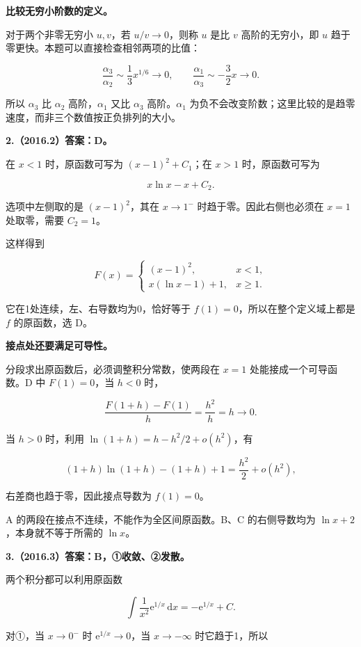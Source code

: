 \documentclass[UTF8,11pt,fontset=windows]{ctexart}
\begin{document}
\textbf{比较无穷小阶数的定义。}

对于两个非零无穷小 $u,v$，若 $u/v\to0$，则称 $u$ 是比 $v$ 高阶的无穷小，即 $u$ 趋于零更快。本题可以直接检查相邻两项的比值：

$$
\frac{\alpha_3}{\alpha_2}\sim\frac13x^{1/6}\longrightarrow0,
\qquad
\frac{\alpha_1}{\alpha_3}\sim-\frac32x\longrightarrow0.
$$

所以 $\alpha_3$ 比 $\alpha_2$ 高阶，$\alpha_1$ 又比 $\alpha_3$ 高阶。$\alpha_1$ 为负不会改变阶数；这里比较的是趋零速度，而非三个数值按正负排列的大小。

\clearpage

\textbf{2.（2016.2）答案：D。}

在 $x<1$ 时，原函数可写为 $(x-1)^2+C_1$；在 $x>1$ 时，原函数可写为

$$
x\ln x-x+C_2.
$$

选项中左侧取的是 $(x-1)^2$，其在 $x\to1^-$ 时趋于零。因此右侧也必须在 $x=1$ 处取零，需要 $C_2=1$。

这样得到

$$
F(x)=\begin{cases}(x-1)^2,&x<1,\\x(\ln x-1)+1,&x\ge1.\end{cases}
$$

它在1处连续，左、右导数均为0，恰好等于 $f(1)=0$，所以在整个定义域上都是 $f$ 的原函数，选 D。

\textbf{接点处还要满足可导性。}

分段求出原函数后，必须调整积分常数，使两段在 $x=1$ 处能接成一个可导函数。D 中 $F(1)=0$，当 $h<0$ 时，

$$
\frac{F(1+h)-F(1)}h=\frac{h^2}{h}=h\longrightarrow0.
$$

当 $h>0$ 时，利用 $\ln(1+h)=h-h^2/2+o(h^2)$，有

$$
(1+h)\ln(1+h)-(1+h)+1=\frac{h^2}{2}+o(h^2),
$$

右差商也趋于零，因此接点导数为 $f(1)=0$。

A 的两段在接点不连续，不能作为全区间原函数。B、C 的右侧导数均为 $\ln x+2$，本身就不等于所需的 $\ln x$。

\clearpage

\textbf{3.（2016.3）答案：B，①收敛、②发散。}

两个积分都可以利用原函数

$$
\int\frac1{x^2}\mathrm e^{1/x}\,\mathrm dx=-\mathrm e^{1/x}+C.
$$

对①，当 $x\to0^-$ 时 $\mathrm e^{1/x}\to0$，当 $x\to-\infty$ 时它趋于1，所以
\end{document}
